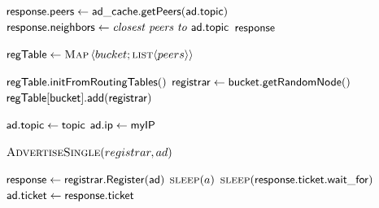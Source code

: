 \begin{algorithm}[]%
    \caption{%
        Lookup response algorithm run by registrars.
    }%
    \label{alg:registrar_register}%
    \begin{algorithmic}[1]%
        \footnotesize%
            \State $\mathsf{response.peers} \gets \mathsf{ad\_cache.getPeers}(\mathsf{ad.topic})$
            \State $\mathsf{response.neighbors} \gets \textit{closest peers to } \mathsf{ad.topic}$
            \State \Return $\mathsf{response}$
        \EndProcedure
    \end{algorithmic}%
\end{algorithm}%


\begin{algorithm}[]%
    \caption{%
        Advertisement algorithm run by advertisers.
    }%
    \label{alg:advertiser_register}%
    \begin{algorithmic}[1]%
         \footnotesize
        \State $\mathsf{regTable} \gets  \textsc{Map}\left \langle bucket;\textsc{list}\langle peers \rangle \right \rangle$
        \item[]
            \State $\mathsf{regTable.initFromRoutingTables()}$
                    \State $\mathsf{registrar} \gets \mathsf{bucket.getRandomNode()}$
                    \State $\mathsf{regTable[bucket].add}(\mathsf{registrar})$
                    \EndIf
                
                \State $\mathsf{ad.topic} \gets \mathsf{topic}$
                \State $\mathsf{ad.ip} \gets \mathsf{myIP}$

                \State $\Call{AdvertiseSingle}{registrar, ad}$
            \EndFor
        \EndProcedure
        \item[]
                \State $\mathsf{response} \gets \mathsf{registrar.Register(ad)}$
                    \State $\Call{sleep}{a}$
                    \State $\Call{sleep}{\algvar{response.ticket.wait\_for}}$
                    \State $\mathsf{ad.ticket} \gets \mathsf{response.ticket}$
                \EndIf
            \EndWhile

        \EndProcedure
    \end{algorithmic}%
\end{algorithm}%



